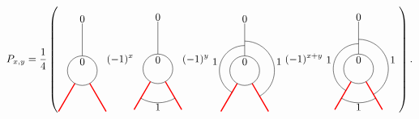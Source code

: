 	\begin{equation}
		P_{x,y}=\frac{1}{4}\left(
			\begin{tikzpicture}[scale=1,baseline=(current bounding box.center)]
			\draw (0,0) circle (0.5cm);
			\draw[red,line width=0.4mm]
			\foreach \a in {-60, -120} {
				(\a:0.5) -- (\a:1.6)
			};
			\draw[] (90:0.5) -- (90:1.6);
			\node at (90:.3cm){$0$};\node at (90:1.75cm){$0$};
			\end{tikzpicture}
			(-1)^x
			\begin{tikzpicture}[scale=1,baseline=(current bounding box.center)]
			\draw (0,0) circle (0.5cm);
			\draw[red,line width=0.4mm]
			\foreach \a in {-60, -120} {
				(\a:0.5) -- (\a:1.6)
			};
			\draw ([shift=(-120:1.15cm)]0,0) arc (-120:-60:1.15cm);
			\draw[] (90:0.5) -- (90:1.6);
			\node at (90:.3cm){$0$};\node at (90:1.75cm){$0$};
						\node at (0,-1.3) {$1$};
			\end{tikzpicture}
			(-1)^y
			\begin{tikzpicture}[scale=1,baseline=(current bounding box.center)]
			\draw (0,0) circle (0.5cm);
			\draw[red,line width=0.4mm]
			\foreach \a in {-60, -120} {
				(\a:0.5) -- (\a:1.6)
			};
									\draw ([shift=(-60:1cm)]0,0) arc (-60:90:1cm);
									\draw ([shift=(240:0.85cm)]0,0) arc (240:90:0.85cm);
			\draw[] (90:0.5) -- (90:1.6);
			\node at (90:.3cm){$0$};\node at (90:1.75cm){$0$};
						\node at (-1,0.3) {$1$};
									\node at (1.15,0.3) {$1$};
			\end{tikzpicture}
			(-1)^{x+y}
			\begin{tikzpicture}[scale=1,baseline=(current bounding box.center)]
			\draw (0,0) circle (0.5cm);
			\draw[red,line width=0.4mm]
			\foreach \a in {-60, -120} {
				(\a:0.5) -- (\a:1.6)
			};
									\draw ([shift=(-60:1cm)]0,0) arc (-60:90:1cm);
			\draw ([shift=(-120:1.15cm)]0,0) arc (-120:-60:1.15cm);
									\draw ([shift=(240:0.85cm)]0,0) arc (240:90:0.85cm);
			\draw[] (90:0.5) -- (90:1.6);
			\node at (90:.3cm){$0$};\node at (90:1.75cm){$0$};
			\node at (-1,0.3) {$1$};
			\node at (1.15,0.3) {$1$};
			\node at (0,-1.3) {$1$};
			\end{tikzpicture}
			\right).
	\end{equation}
	
